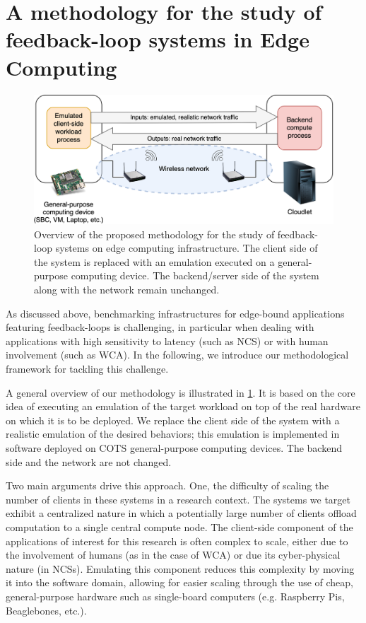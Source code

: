 \section{A methodology for the study of feedback-loop systems in Edge Computing}\label{summary:methodology}

\begin{figure}
    \centering
    \includegraphics[width=.8\textwidth]{Figs/methodology.png}
    \caption{%
        Overview of the proposed methodology for the study of feedback-loop systems on edge computing infrastructure.
        The  client side of the system is replaced with an emulation executed on a general-purpose computing device.
        The backend/server side of the system along with the network remain unchanged.
    }\label{fig:methodology}
\end{figure}

As discussed above, benchmarking infrastructures for edge-bound applications featuring feedback-loops is challenging, in particular when dealing with applications with high sensitivity to latency (such as \gls{NCS}) or with human involvement (such as \gls{WCA}).
In the following, we introduce our methodological framework for tackling this challenge.

A general overview of our methodology is illustrated in \cref{fig:methodology}.
It is based on the core idea of executing an emulation of the target workload on top of the real hardware on which it is to be deployed.
We replace the client side of the system with a realistic emulation of the desired behaviors; this emulation is implemented in software deployed on \gls{COTS} general-purpose computing devices.
The backend side and the network are not changed.

Two main arguments drive this approach.
One, the difficulty of scaling the number of clients in these systems in a research context.
The systems we target exhibit a centralized nature in which a potentially large number of clients offload computation to a single central compute node.
The client-side component of the applications of interest for this research is often complex to scale, either due to the involvement of humans (as in the case of \gls{WCA}) or due its cyber-physical nature (in \glspl{NCS}).
Emulating this component reduces this complexity by moving it into the software domain, allowing for easier scaling through the use of cheap, general-purpose hardware such as single-board computers (e.g. Raspberry Pis, Beaglebones, etc.).

